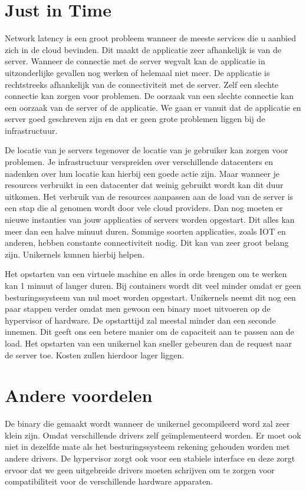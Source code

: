\documentclass[pdftex,a4paper,12pt,twoside]{report}
\begin{document}
\section{Just in Time}

Network latency is een groot probleem wanneer de meeste services die u aanbied zich in de cloud bevinden. Dit maakt de applicatie zeer afhankelijk is van de server.  Wanneer de connectie met de server wegvalt kan de applicatie in uitzonderlijke gevallen nog werken of helemaal niet meer. De applicatie is rechtstreeks afhankelijk van de connectiviteit met de server. Zelf een slechte connectie kan zorgen voor problemen. De oorzaak van een slechte connectie kan een oorzaak van de server of de applicatie. We gaan er vanuit dat de applicatie en server goed geschreven zijn en dat er geen grote problemen liggen bij de infrastructuur.

De locatie van je servers tegenover de locatie van je gebruiker kan zorgen voor problemen. Je infrastructuur verspreiden over verschillende datacenters en nadenken over hun locatie kan hierbij een goede actie zijn. Maar wanneer je resources verbruikt in een datacenter dat weinig gebruikt wordt kan dit duur uitkomen. Het verbruik van de resources aanpassen aan de load van de server is een stap die al genomen wordt door vele cloud providers. Dan nog moeten er nieuwe instanties van jouw applicaties of servers worden opgestart. Dit alles kan meer dan een halve minuut duren. Sommige soorten applicaties, zoals IOT en anderen, hebben constante connectiviteit nodig. Dit kan van zeer groot belang zijn. Unikernels kunnen hierbij helpen.

Het opstarten van een virtuele machine en alles in orde brengen om te werken kan 1 minuut of langer duren. Bij containers wordt dit veel minder omdat er geen besturingssysteem van nul moet worden opgestart. Unikernels neemt dit nog een paar stappen verder omdat men gewoon een binary moet uitvoeren op de hypervisor of hardware. De opstarttijd zal meestal minder dan een seconde innemen. Dit geeft ons een betere manier om de capaciteit aan te passen aan de load. Het opstarten van een unikernel kan sneller gebeuren dan de request naar de server toe. Kosten zullen hierdoor lager liggen.

\section{Andere voordelen}

De binary die gemaakt wordt wanneer de unikernel gecompileerd word zal zeer klein zijn. Omdat verschillende drivers zelf geïmplementeerd worden. Er moet ook niet in dezelfde mate als het besturingssysteem rekening gehouden worden met andere drivers. De hypervisor zorgt ook voor een stabiele interface en deze zorgt ervoor dat we geen uitgebreide drivers moeten schrijven om te zorgen voor compatibiliteit voor de verschillende hardware apparaten.
\end{document}
